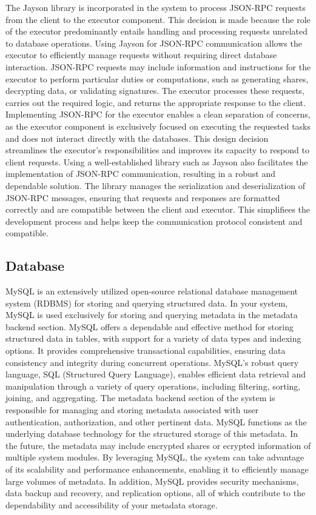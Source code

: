 \documentclass[../Main.tex]{subfiles}
\begin{document}
\indent The Jayson library is incorporated in the system to process JSON-RPC requests from the client to the executor component. This decision is made because the role of the executor predominantly entails handling and processing requests unrelated to database operations. Using Jayson for JSON-RPC communication allows the executor to efficiently manage requests without requiring direct database interaction. JSON-RPC requests may include information and instructions for the executor to perform particular duties or computations, such as generating shares, decrypting data, or validating signatures. The executor processes these requests, carries out the required logic, and returns the appropriate response to the client. Implementing JSON-RPC for the executor enables a clean separation of concerns, as the executor component is exclusively focused on executing the requested tasks and does not interact directly with the databases. This design decision streamlines the executor's responsibilities and improves its capacity to respond to client requests. Using a well-established library such as Jayson also facilitates the implementation of JSON-RPC communication, resulting in a robust and dependable solution. The library manages the serialization and deserialization of JSON-RPC messages, ensuring that requests and responses are formatted correctly and are compatible between the client and executor. This simplifiees the development process and helps keep the communication protocol consistent and compatible.
\subsection{Database}
MySQL\cite{mysql} is an extensively utilized open-source relational database management system (RDBMS) for storing and querying structured data. In your system, MySQL is used exclusively for storing and querying metadata in the metadata backend section. MySQL offers a dependable and effective method for storing structured data in tables, with support for a variety of data types and indexing options. It provides comprehensive transactional capabilities, ensuring data consistency and integrity during concurrent operations. MySQL's robust query language, SQL (Structured Query Language), enables efficient data retrieval and manipulation through a variety of query operations, including filtering, sorting, joining, and aggregating. The metadata backend section of the system is responsible for managing and storing metadata associated with user authentication, authorization, and other pertinent data. MySQL functions as the underlying database technology for the structured storage of this metadata. In the future, the metadata may include encrypted shares or ecrypted information of multiple system modules. By leveraging MySQL, the system can take advantage of its scalability and performance enhancements, enabling it to efficiently manage large volumes of metadata. In addition, MySQL provides security mechanisms, data backup and recovery, and replication options, all of which contribute to the dependability and accessibility of your metadata storage. 
\end{document}

